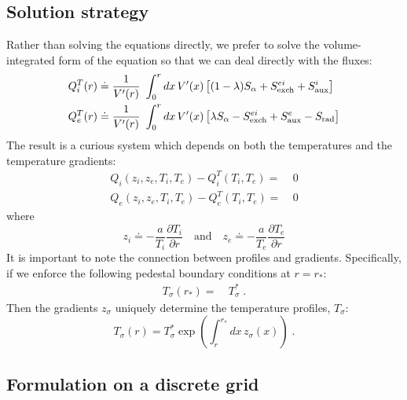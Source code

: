 \documentclass[dvips,12pt]{revtex4}
\newcommand\vpr{V^\prime}
\begin{document}
\subsection{Solution strategy}

Rather than solving the equations directly, we prefer to solve 
the volume-integrated form of the equation so that we can 
deal directly with the fluxes:
%
\begin{align}
Q_i^T(r) \doteq \frac{1}{\vpr(r)} & ~\int_0^r dx \, \vpr(x) \left[
  (1-\lambda) S_\alpha + S_{\rm exch}^{ei} + S_{\rm aux}^i \right] \\ 
Q_e^T(r) \doteq \frac{1}{\vpr(r)} & ~\int_0^r dx \, \vpr(x) \left[ 
  \lambda S_\alpha - S_{\rm exch}^{ei} + S_{\rm aux}^e - S_{\rm rad} \right]  
\end{align}
%
The result is a curious system which depends on both the temperatures 
and the temperature gradients:
%
\begin{align}
Q_i(z_i,z_e,T_i,T_e) - Q_i^T(T_i,T_e) = &~0 \\
Q_e(z_i,z_e,T_i,T_e) - Q_e^T(T_i,T_e) = &~0
\end{align}
%
where
%
\begin{equation}
z_i \doteq - \frac{a}{T_i} \frac{\partial T_i}{\partial r} 
\quad\mbox{and}\quad 
z_e \doteq - \frac{a}{T_e} \frac{\partial T_e}{\partial r}
\end{equation}
%
It is important to note the connection between profiles and 
gradients.  Specifically, if we enforce the following pedestal 
boundary conditions at $r=r_*$:
%
\begin{align}
T_\sigma(r_*) = &~T_\sigma^* \; .
\end{align}
%
Then the gradients $z_\sigma$ uniquely determine the 
temperature profiles, $T_\sigma$:
%
\begin{equation}
T_\sigma(r) = T_\sigma^* 
 \exp\left( \int_r^{r_*} dx \, z_\sigma(x) \right) \; .
\end{equation}

\subsection{Formulation on a discrete grid}
\end{document}
